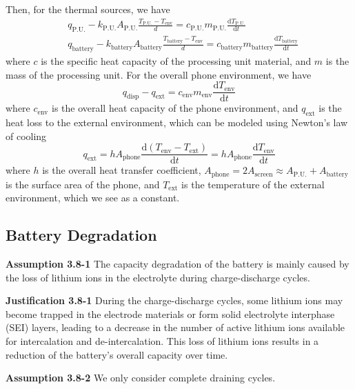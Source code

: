 \documentclass[12pt]{article}
\begin{document}
Then, for the thermal sources, we have
\begin{eqnarray}
	& q_\mathrm {P.U.}-k_\mathrm {P.U.}A_\mathrm{P.U.}\frac{T_\mathrm{P.U.}-T_\mathrm{env}}{d}=c_\mathrm{P.U.}m_\mathrm{P.U.}\frac{\mathrm dT_\mathrm{P.U.}}{\mathrm dt} \\
	& q_\mathrm {battery}-k_\mathrm {battery}A_\mathrm{battery}\frac{T_\mathrm{battery}-T_\mathrm{env}}{d}=c_\mathrm{battery}m_\mathrm{battery}\frac{\mathrm dT_\mathrm{battery}}{\mathrm dt}
\end{eqnarray}
where $c$ is the specific heat capacity of the processing unit material, and $m$ is the mass of the processing unit. For the overall phone environment, we have
\begin{equation}
	q_\mathrm{disp}-q_\mathrm{ext}=c_\mathrm{env}m_\mathrm{env}\frac{\mathrm dT_\mathrm{env}}{\mathrm dt}
\end{equation}
where $c_\mathrm{env}$ is the overall heat capacity of the phone environment, and $q_\mathrm{ext}$ is the heat loss to the external environment, which can be modeled using Newton's law of cooling
\begin{equation}
	q_\mathrm{ext}=hA_\mathrm{phone}\frac{\mathrm d(T_\mathrm{env}-T_\mathrm{ext})}{\mathrm dt}=hA_\mathrm{phone}\frac{\mathrm dT_\mathrm {env}}{\mathrm dt}
\end{equation}
where $h$ is the overall heat transfer coefficient, $A_\mathrm{phone}=2A_\mathrm{screen}\approx A_\mathrm{P.U.}+A_\mathrm{battery}$ is the surface area of the phone, and $T_\mathrm{ext}$ is the temperature of the external environment, which we see as a constant.

\subsection{Battery Degradation}

\noindent \textbf{Assumption 3.8-1} \quad The capacity degradation of the battery is mainly caused by the loss of lithium ions in the electrolyte during charge-discharge cycles.

\noindent \textbf{Justification 3.8-1} \quad During the charge-discharge cycles, some lithium ions may become trapped in the electrode materials or form solid electrolyte interphase (SEI) layers, leading to a decrease in the number of active lithium ions available for intercalation and de-intercalation. This loss of lithium ions results in a reduction of the battery's overall capacity over time.

\noindent \textbf{Assumption 3.8-2} \quad We only consider complete draining cycles.
\end{document}
